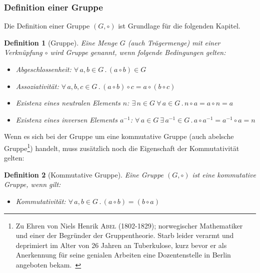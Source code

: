 \documentclass[12pt,a4paper, usenames, dvipsnames]{article}
\theoremstyle{mystyle}
\newtheorem{definition}{Definition}
\theoremstyle{definition}
\begin{document}
\subsubsection*{Definition einer Gruppe}

Die Definition einer Gruppe $(G, \circ)$ ist Grundlage für die folgenden Kapitel. 

\begin{definition}[Gruppe]
Eine Menge $G$ (auch Trägermenge) mit einer Verknüpfung $\circ$ wird Gruppe genannt, wenn folgende Bedingungen gelten: 
\vspace*{-0.5em}
\begin{itemize}
\item Abgeschlossenheit: $\forall \, a,b \in G \, . \, (a \circ b) \in G $
\item Assoziativität: $\forall \, a,b,c \in G \, . \, (a \circ b) \circ c = a \circ (b \circ c)$
\item Existenz eines neutralen Elements $n$: $\exists \, n \in G \ \forall \,  a \in G \, . \, n \circ a = a \circ n = a$ 
\item Existenz eines inversen Elements $a^{-1}$: $\forall \, a \in G \ \exists \, a^{-1} \in G \, . \, a \circ a^{-1} = a^{-1} \circ a = n$ 
\end{itemize}
\end{definition}

Wenn es sich bei der Gruppe um eine kommutative Gruppe (auch abelsche Gruppe\footnote{\glqq Zu Ehren von Niels Henrik \textsc{Abel} (1802-1829); norwegischer Mathematiker und einer der Begründer der Gruppentheorie. Starb leider verarmt und deprimiert im Alter von 26 Jahren an Tuberkulose, kurz bevor er als Anerkennung für seine genialen Arbeiten  eine Dozentenstelle in Berlin angeboten bekam.\grqq \  \cite[S.21, Z.23]{Buch}}) handelt, muss zusätzlich noch die Eigenschaft der Kommutativität gelten: 

\begin{definition}[Kommutative Gruppe]
Eine Gruppe $(G, \circ)$ ist eine kommutative Gruppe, wenn gilt:
\vspace*{-0.5em}
\begin{itemize}
\item Kommutativität: $\forall \, a,b \in G \, . \, (a \circ b) = (b \circ a) $
\end{itemize}
\end{definition}
\vspace*{0.1cm}
\end{document}
